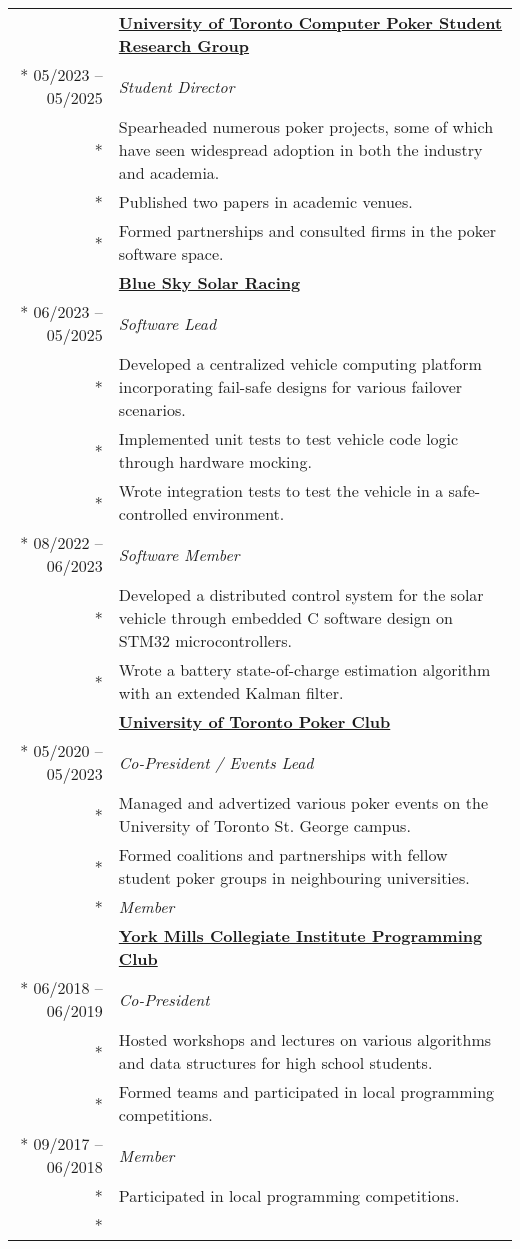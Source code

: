 \documentclass{article}
\begin{document}
	\begin{tabularx}{\textwidth}{r X}
		& \textbf{\href{https://uoftcprg.com/}{University of Toronto Computer Poker Student Research Group}} \\*
		05/2023 -- 05/2025 & \textit{Student Director} \\*
		& {\small Spearheaded numerous poker projects, some of which have seen widespread adoption in both the industry and academia.} \\*
		& {\small Published two papers in academic venues.} \\*
		& {\small Formed partnerships and consulted firms in the poker software space.} \\
		\addlinespace
		& \textbf{\href{https://www.blueskysolar.org/}{Blue Sky Solar Racing}} \\*
		06/2023 -- 05/2025 & \textit{Software Lead} \\*
		& {\small Developed a centralized vehicle computing platform incorporating fail-safe designs for various failover scenarios.} \\*
		& {\small Implemented unit tests to test vehicle code logic through hardware mocking.} \\*
		& {\small Wrote integration tests to test the vehicle in a safe-controlled environment.} \\*
		08/2022 -- 06/2023 & \textit{Software Member} \\*
		& {\small Developed a distributed control system for the solar vehicle through embedded C software design on STM32 microcontrollers.} \\*
		& {\small Wrote a battery state-of-charge estimation algorithm with an extended Kalman filter.} \\
		\addlinespace
		& \textbf{\href{https://uoftpoker.com/}{University of Toronto Poker Club}} \\*
		05/2020 -- 05/2023 & \textit{Co-President / Events Lead} \\*
		& {\small Managed and advertized various poker events on the University of Toronto St. George campus.} \\*
		& {\small Formed coalitions and partnerships with fellow student poker groups in neighbouring universities.} \\*
		\iftoggle{verbose}{
			09/2019 -- 05/2020 & \textit{Member} \\
			\addlinespace
			& \textbf{\href{https://schoolweb.tdsb.on.ca/yorkmillsci/Departments/Computer-Science/Clubs}{York Mills Collegiate Institute Programming Club}} \\*
			06/2018 -- 06/2019 & \textit{Co-President} \\*
			& {\small Hosted workshops and lectures on various algorithms and data structures for high school students.} \\*
			& {\small Formed teams and participated in local programming competitions.} \\*
			09/2017 -- 06/2018 & \textit{Member} \\*
			& {\small Participated in local programming competitions.} \\*
		}{}
	\end{tabularx}
\end{document}

